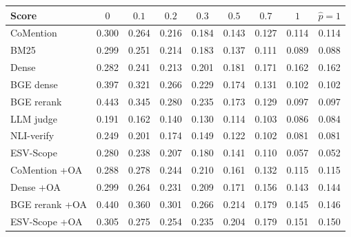\setlength{\tabcolsep}{2.5pt}
\begin{tabular}{lcccccccc}
\toprule
Score & $0$ & $0.1$ & $0.2$ & $0.3$ & $0.5$ & $0.7$ & $1$ & $\hat p{=}1$ \\
\midrule
CoMention & 0.300 & 0.264 & 0.216 & 0.184 & 0.143 & 0.127 & 0.114 & 0.114 \\
BM25 & 0.299 & 0.251 & 0.214 & 0.183 & 0.137 & 0.111 & 0.089 & 0.088 \\
Dense & 0.282 & 0.241 & 0.213 & 0.201 & 0.181 & 0.171 & 0.162 & 0.162 \\
BGE dense & 0.397 & 0.321 & 0.266 & 0.229 & 0.174 & 0.131 & 0.102 & 0.102 \\
BGE rerank & 0.443 & 0.345 & 0.280 & 0.235 & 0.173 & 0.129 & 0.097 & 0.097 \\
LLM judge & 0.191 & 0.162 & 0.140 & 0.130 & 0.114 & 0.103 & 0.086 & 0.084 \\
NLI-verify & 0.249 & 0.201 & 0.174 & 0.149 & 0.122 & 0.102 & 0.081 & 0.081 \\
ESV-Scope & 0.280 & 0.238 & 0.207 & 0.180 & 0.141 & 0.110 & 0.057 & 0.052 \\
\midrule
CoMention +OA & 0.288 & 0.278 & 0.244 & 0.210 & 0.161 & 0.132 & 0.115 & 0.115 \\
Dense +OA & 0.299 & 0.264 & 0.231 & 0.209 & 0.171 & 0.156 & 0.143 & 0.144 \\
BGE rerank +OA & 0.440 & 0.360 & 0.301 & 0.266 & 0.214 & 0.179 & 0.145 & 0.146 \\
ESV-Scope +OA & 0.305 & 0.275 & 0.254 & 0.235 & 0.204 & 0.179 & 0.151 & 0.150 \\
\bottomrule
\end{tabular}
